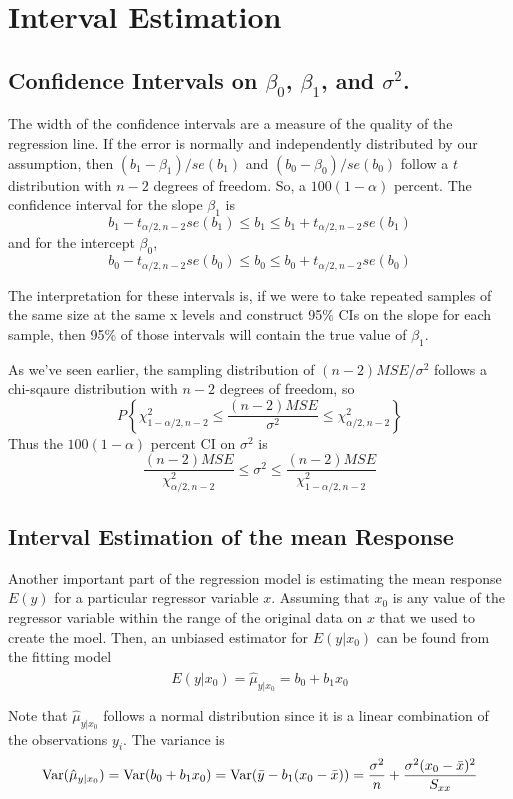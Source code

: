 \section{Interval Estimation}

\subsection{Confidence Intervals on $\beta_0$, $\beta_1$, and $\sigma^2$.}

The width of the confidence intervals are a measure of the quality of the regression line. If the error is normally and independently distributed by our assumption, then $(b_1 - \beta_1)/se(b_1)$ and $(b_0 - \beta_0)/se(b_0)$ follow a $t$ distribution with $n-2$ degrees of freedom. So, a $100(1 - \alpha)$ percent. The confidence interval for the slope $\beta_1$ is 
\[b_1 - t_{\alpha/2, n-2}se(b_1) \leq b_1 \leq b_1 + t_{\alpha/2, n-2}se(b_1)  \]
and for the intercept $\beta_0$, 
\[b_0 - t_{\alpha/2, n-2}se(b_0) \leq b_0 \leq b_0 + t_{\alpha/2, n-2}se(b_0)\]


The interpretation for these intervals is, if we were to take repeated samples of the same size at the same x levels and construct 95\% CIs on the slope for each sample, then 95\% of those intervals will contain the true value of $\beta_1$.

As we've seen earlier, the sampling distribution of $(n-2)MSE/\sigma^2$ follows a chi-sqaure distribution with $n-2$ degrees of freedom, so 
\[P\left\{\chi^2_{1-\alpha/2, n-2} \leq \frac{(n-2)MSE}{\sigma^2} \leq \chi^2_{\alpha/2, n-2}\right\}\]
Thus the $100(1-\alpha)$ percent CI on $\sigma^2$ is 
\[\frac{(n-2)MSE}{\chi^2_{\alpha/2, n-2}} \leq \sigma^2 \leq \frac{(n-2)MSE}{\chi^2_{1 - \alpha/2, n-2}}\]

\subsection{Interval Estimation of the mean Response}

Another important part of the regression model is estimating the mean response $E(y)$ for a particular regressor variable $x$. Assuming that $x_0$ is any value of the regressor variable within the range of the original data on $x$ that we used to create the moel. Then, an unbiased estimator for $E(y|x_0)$ can be found from the fitting model 
\[\widehat{E(y|x_0)} = \hat{\mu}_{y|x_0} =b_0 + b_1x_0\]

Note that $\hat{\mu}_{y|x_0}$ follows a normal distribution since it is a linear combination of the observations $y_i$. The variance is 
\[\operatorname{Var}(\hat{\mu}_{y|x_0}) = \operatorname{Var}(b_0 + b_1x_0) = \operatorname{Var}(\bar{y} - b_1(x_0 -\bar{x})) = \frac{\sigma^2}{n} + \frac{\sigma^2(x_0-\bar{x})^2}{S_{xx}}\]

